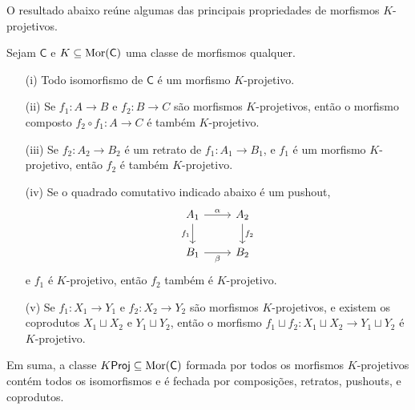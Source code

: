O resultado abaixo reúne algumas das principais propriedades de morfismos $K$-projetivos.

\begin{prop}\label{prop:props_morfismos_proj}
  Sejam $\mathsf{C}$ e $K \subseteq \mathrm{Mor}(\mathsf{C})$ uma classe de morfismos qualquer.
  \begin{enumerate}
    \item[(i)] Todo isomorfismo de $\mathsf{C}$ é um morfismo $K$-projetivo.
    
    \item[(ii)] Se $f_1: A \to B$ e $f_2: B \to C$ são morfismos $K$-projetivos, então o morfismo composto $f_2 \circ f_1: A \to C$ é também $K$-projetivo.

    \item[(iii)] Se $f_2: A_2 \to B_2$ é um retrato de $f_1: A_1 \to B_1$, e $f_1$ é um morfismo $K$-projetivo, então $f_2$ é também $K$-projetivo.
    
    \item[(iv)] Se o quadrado comutativo indicado abaixo é um pushout,
    \begin{displaymath}
      \begin{tikzcd}
        A_1
        \arrow[r, "\alpha"]
        \arrow[d, "f_1" swap]
        & A_2
        \arrow[d, "f_2"]
        \\ B_1
        \arrow[r, "\beta" swap]
        & B_2
      \end{tikzcd}
    \end{displaymath}
    e $f_1$ é $K$-projetivo, então $f_2$ também é $K$-projetivo.

    \item[(v)] Se $f_1: X_1 \to Y_1$ e $f_2: X_2 \to Y_2$ são morfismos $K$-projetivos, e existem os coprodutos $X_1 \sqcup X_2$ e $Y_1 \sqcup Y_2$, então o morfismo $f_1 \sqcup f_2: X_1 \sqcup X_2 \to Y_1 \sqcup Y_2$ é $K$-projetivo.
  \end{enumerate}
  Em suma, a classe $K\mathsf{Proj} \subseteq \mathrm{Mor}(\mathsf{C})$ formada por todos os morfismos $K$-projetivos contém todos os isomorfismos e é fechada por composições, retratos, pushouts, e coprodutos.
\end{prop}

